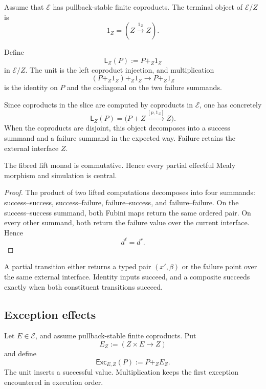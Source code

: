 Assume that \(\mathcal E\) has pullback-stable finite coproducts.  The
terminal object of \(\mathcal E/Z\) is
\[
    1_Z=(Z\xrightarrow{1_Z}Z).
\]

\begin{definition}
\label{def:fibred-lift-monad}
Define
\[
    \mathsf L_Z(P)
    :=
    P+_Z1_Z
\]
in \(\mathcal E/Z\).  The unit is the left coproduct injection, and
multiplication
\[
    (P+_Z1_Z)+_Z1_Z
    \longrightarrow
    P+_Z1_Z
\]
is the identity on \(P\) and the codiagonal on the two failure summands.
\end{definition}

Since coproducts in the slice are computed by coproducts in \(\mathcal E\),
one has concretely
\[
    \mathsf L_Z(P)
    =
    \bigl(
        P+Z\xrightarrow{[p,1_Z]}Z
    \bigr).
\]
When the coproducts are disjoint, this object decomposes into a success
summand and a failure summand in the expected way.  Failure retains the
external interface \(Z\).

\begin{proposition}
\label{prop:partiality-central}
The fibred lift monad is commutative.  Hence every partial effectful Mealy
morphism and simulation is central.
\end{proposition}

\begin{proof}
The product of two lifted computations decomposes into four summands:
success--success, success--failure, failure--success, and failure--failure.
On the success--success summand, both Fubini maps return the same ordered
pair.  On every other summand, both return the failure value over the current
interface.  Hence
\[
    d^\ell=d^r.
\]
\end{proof}

A partial transition either returns a typed pair \((x',\beta)\) or the
failure point over the same external interface.  Identity inputs succeed, and
a composite succeeds exactly when both constituent transitions succeed.

\subsection{Exception effects}
\label{subsec:exception-effects}

Let \(E\in\mathcal E\), and assume pullback-stable finite coproducts.  Put
\[
    E_Z:=(Z\times E\to Z)
\]
and define
\[
    \mathsf{Exc}_{E,Z}(P)
    :=
    P+_ZE_Z.
\]
The unit inserts a successful value.  Multiplication keeps the first
exception encountered in execution order.

